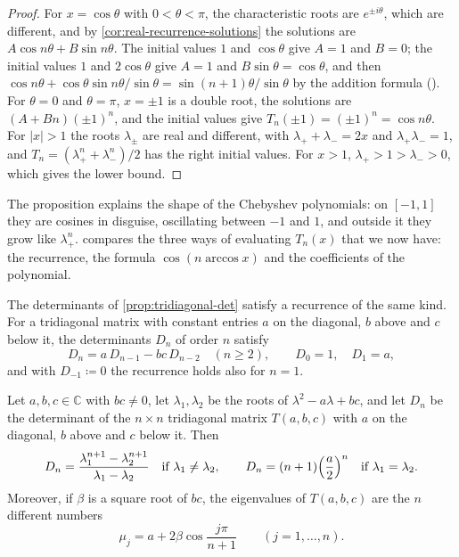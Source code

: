 \begin{proof}
For $x=\cos\theta$ with $0<\theta<\pi$, the characteristic roots are $e^{\pm i\theta}$, which are different, and by \cref{cor:real-recurrence-solutions} the solutions are $A\cos n\theta+B\sin n\theta$. The initial values $1$ and $\cos\theta$ give $A=1$ and $B=0$; the initial values $1$ and $2\cos\theta$ give $A=1$ and $B\sin\theta=\cos\theta$, and then $\cos n\theta+\cos\theta\sin n\theta/\sin\theta=\sin(n+1)\theta/\sin\theta$ by the addition formula (). For $\theta=0$ and $\theta=\pi$, $x=\pm1$ is a double root, the solutions are $(A+Bn)(\pm1)^n$, and the initial values give $T_n(\pm1)=(\pm1)^n=\cos n\theta$. For $|x|>1$ the roots $\lambda_\pm$ are real and different, with $\lambda_++\lambda_-=2x$ and $\lambda_+\lambda_-=1$, and $T_n=(\lambda_+^n+\lambda_-^n)/2$ has the right initial values. For $x>1$, $\lambda_+>1>\lambda_->0$, which gives the lower bound.
\end{proof}

The proposition explains the shape of the Chebyshev polynomials: on $[-1,1]$ they are cosines in disguise, oscillating between $-1$ and $1$, and outside it they grow like $\lambda_+^n$.  compares the three ways of evaluating $T_n(x)$ that we now have: the recurrence, the formula $\cos(n\arccos x)$ and the coefficients of the polynomial.

The determinants of \cref{prop:tridiagonal-det} satisfy a recurrence of the same kind. For a tridiagonal matrix with constant entries $a$ on the diagonal, $b$ above and $c$ below it, the determinants $D_n$ of order $n$ satisfy
\[
D_n=a\,D_{n-1}-bc\,D_{n-2}\quad(n\ge2),\qquad D_0=1,\quad D_1=a ,
\]
and with $D_{-1}\coloneqq0$ the recurrence holds also for $n=1$.

\begin{proposition}
\label{prop:tridiagonal-closed}
Let $a,b,c\in\mathbb C$ with $bc\ne0$, let $\lambda_1,\lambda_2$ be the roots of $\lambda^2-a\lambda+bc$, and let $D_n$ be the determinant of the $n\times n$ tridiagonal matrix $T(a,b,c)$ with $a$ on the diagonal, $b$ above and $c$ below it. Then
\[
D_n=\frac{\lambda_1^{n+1}-\lambda_2^{n+1}}{\lambda_1-\lambda_2}\quad\text{if }\lambda_1\ne\lambda_2,\qquad D_n=(n+1)\Bigl(\frac a2\Bigr)^n\quad\text{if }\lambda_1=\lambda_2 .
\]
Moreover, if $\beta$ is a square root of $bc$, the eigenvalues of $T(a,b,c)$ are the $n$ different numbers
\[
\mu_j=a+2\beta\cos\frac{j\pi}{n+1}\qquad(j=1,\ldots,n).
\]
\end{proposition}

